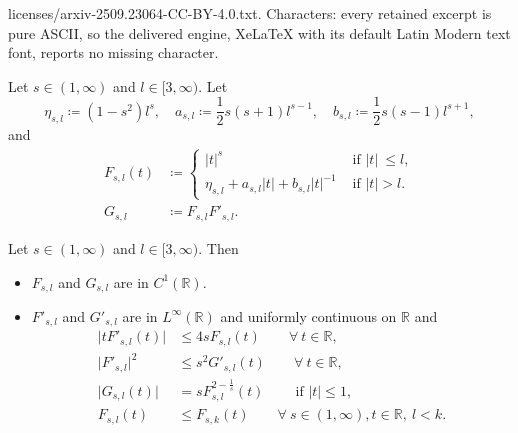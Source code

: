 \documentclass[10pt,a4paper]{amsart}
\newcommand{\RR}{{\mathbb R}}
\newcommand{\abs}[1]{\lvert#1\rvert}
\begin{document}
licenses/arxiv-2509.23064-CC-BY-4.0.txt. Characters: every retained excerpt is pure ASCII, so the delivered engine, XeLaTeX with its default Latin Modern text font, reports no missing character.
\begin{definition} Let  $s \in (1,\infty)$ and $l \in
  [3,\infty)$. Let
  $$\eta_{s,l}\coloneqq (1-s^{2})l^{s},\quad a_{s,l}\coloneqq \frac{1}{2}s(s+1)l^{s-1},\quad b_{s,l}\coloneqq \frac{1}{2} s(s-1)l^{s+1},$$  and 
  \begin{align}
    F_{s,l}(t)
    &\coloneqq
    \begin{cases}
|t|^{s}&\text{ if } |t| ~\le l,\\
\eta_{s,l}+a_{s,l}|t| +b_{s,l}|t|^{-1}&\text{ if } |t| > l.
\end{cases}
\label{f1b}\\
G_{s,l}&\coloneqq F_{s,l}F'_{s,l}.
\label{f1b2}
\end{align}
\label{def61}
\end{definition}

\begin{lemma}
  Let $s \in (1,\infty)$ and $l \in [3,\infty)$. Then
  \begin{itemize}
  \item[$(i)$]  $F_{s,l}$ and $G_{s,l}$ are in $C^{1}(\RR)$.
  \item[$(ii)$] $F'_{s,l}$ and $G'_{s,l}$ are in $L^{\infty}(\RR)$ and
  uniformly continuous on $\RR$ and
  \begin{align}
\abs{tF'_{s,l}(t)}
    &\le 4sF_{s,l}(t)\qquad \forall~t\in\RR,
  \label{ss1}\\
  \abs{F'_{s,l}}^{2}
  &\le s^{2}G'_{s,l}(t)\qquad \forall~t\in \RR,
  \label{ss2}\\
  \abs{G_{s,l}(t)}
  &= sF_{s,l}
^{2-\frac{1}{s}}(t)
\qquad ~\text{if }|t|\le 1,
\label{ss3}\\
F_{s,l}(t)
&\le F_{s,k}(t)
\qquad \forall~s\in(1,\infty), t\in\RR,~ l<k.
\label{ss4}
\end{align}
\end{itemize}

\label{lem62}
\end{lemma}
\end{document}
